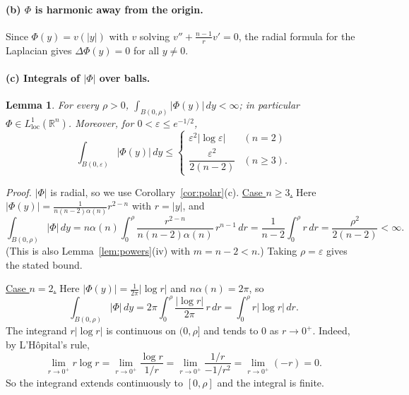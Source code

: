 \documentclass[11pt]{article}
\theoremstyle{plain}
\newtheorem{lemma}[theorem]{Lemma}
\theoremstyle{definition}
\theoremstyle{remark}
\begin{document}
\paragraph{(b) $\Phi$ is harmonic away from the origin.} Since $\Phi(y) = v(|y|)$ with $v$ solving $v'' + \frac{n-1}{r} v' = 0$, the radial formula for the Laplacian gives $\Delta \Phi(y) = 0$ for all $y \neq 0$.

\paragraph{(c) Integrals of $|\Phi|$ over balls.}
\begin{lemma}\label{lem:Phiball}
For every $\rho > 0$, $\int_{B(0,\rho)} |\Phi(y)|\, dy < \infty$; in particular $\Phi \in L^1_{\mathrm{loc}}(\mathbb{R}^n)$. Moreover, for $0 < \varepsilon \leq e^{-1/2}$,
$$ \int_{B(0,\varepsilon)} |\Phi(y)|\, dy \leq \begin{cases} \varepsilon^2 |\log \varepsilon| & (n = 2) \\ \dfrac{\varepsilon^2}{2(n-2)} & (n \geq 3). \end{cases} $$
\end{lemma}

\textit{Proof.} $|\Phi|$ is radial, so we use Corollary~\ref{cor:polar}(c). \underline{Case $n \geq 3$.} Here $|\Phi(y)| = \frac{1}{n(n-2)\alpha(n)} r^{2-n}$ with $r = |y|$, and
$$ \int_{B(0,\rho)} |\Phi|\, dy = n\alpha(n) \int_0^\rho \frac{r^{2-n}}{n(n-2)\alpha(n)}\, r^{n-1}\, dr = \frac{1}{n-2} \int_0^\rho r\, dr = \frac{\rho^2}{2(n-2)} < \infty. $$
(This is also Lemma~\ref{lem:powers}(iv) with $m = n - 2 < n$.) Taking $\rho = \varepsilon$ gives the stated bound.

\underline{Case $n = 2$.} Here $|\Phi(y)| = \frac{1}{2\pi}|\log r|$ and $n\alpha(n) = 2\pi$, so
$$ \int_{B(0,\rho)} |\Phi|\, dy = 2\pi \int_0^\rho \frac{|\log r|}{2\pi}\, r\, dr = \int_0^\rho r|\log r|\, dr. $$
The integrand $r|\log r|$ is continuous on $(0,\rho]$ and tends to $0$ as $r \to 0^+$. Indeed, by L'H\^opital's rule,
$$ \lim_{r\to 0^+} r\log r = \lim_{r \to 0^+} \frac{\log r}{1/r} = \lim_{r \to 0^+} \frac{1/r}{-1/r^2} = \lim_{r\to 0^+}(-r) = 0. $$
So the integrand extends continuously to $[0,\rho]$ and the integral is finite.
\end{document}
